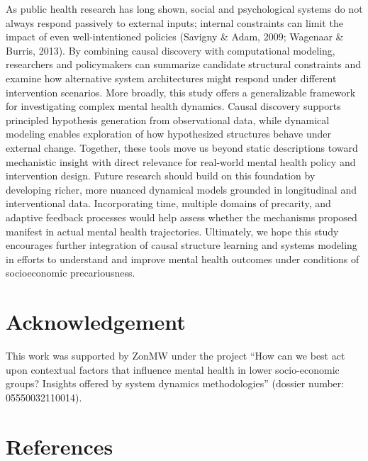 \documentclass[
]{article}
\begin{document}
As public health research has long shown, social and psychological
systems do not always respond passively to external inputs; internal
constraints can limit the impact of even well-intentioned policies
(Savigny \& Adam, 2009; Wagenaar \& Burris, 2013). By combining causal
discovery with computational modeling, researchers and policymakers can
summarize candidate structural constraints and examine how alternative
system architectures might respond under different intervention
scenarios. More broadly, this study offers a generalizable framework for
investigating complex mental health dynamics. Causal discovery supports
principled hypothesis generation from observational data, while
dynamical modeling enables exploration of how hypothesized structures
behave under external change. Together, these tools move us beyond
static descriptions toward mechanistic insight with direct relevance for
real-world mental health policy and intervention design. Future research
should build on this foundation by developing richer, more nuanced
dynamical models grounded in longitudinal and interventional data.
Incorporating time, multiple domains of precarity, and adaptive feedback
processes would help assess whether the mechanisms proposed manifest in
actual mental health trajectories. Ultimately, we hope this study
encourages further integration of causal structure learning and systems
modeling in efforts to understand and improve mental health outcomes
under conditions of socioeconomic precariousness.

\section{Acknowledgement}\label{acknowledgement}

This work was supported by ZonMW under the project ``How can we best act
upon contextual factors that influence mental health in lower
socio-economic groups? Insights offered by system dynamics
methodologies'' (dossier number: 05550032110014).

\section{References}\label{references}
\end{document}
